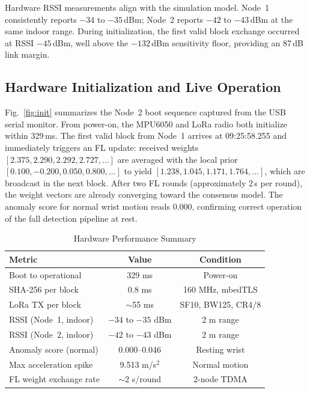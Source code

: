 \documentclass[journal]{IEEEtran}
\begin{document}
Hardware RSSI measurements align with the simulation model. Node~1
consistently reports $-34$ to $-35$\,dBm; Node~2 reports $-42$ to
$-43$\,dBm at the same indoor range. During initialization, the first
valid block exchange occurred at RSSI $-45$\,dBm, well above the
$-132$\,dBm sensitivity floor, providing an 87\,dB link margin.

\subsection{Hardware Initialization and Live Operation}

Fig.~\ref{fig:init} summarizes the Node~2 boot sequence captured from the
USB serial monitor. From power-on, the MPU6050 and LoRa radio both
initialize within 329\,ms. The first valid block from Node~1 arrives at
09:25:58.255 and immediately triggers an FL update: received weights
$[2.375, 2.290, 2.292, 2.727, \ldots]$ are averaged with the local prior
$[0.100, -0.200, 0.050, 0.800, \ldots]$ to yield
$[1.238, 1.045, 1.171, 1.764, \ldots]$, which are broadcast in the
next block. After two FL rounds (approximately 2\,s per round), the weight
vectors are already converging toward the consensus model. The anomaly
score for normal wrist motion reads 0.000, confirming correct operation of
the fall detection pipeline at rest.

\begin{table}[t]
\centering
\caption{Hardware Performance Summary}
\label{tab:hw}
\renewcommand{\arraystretch}{1.2}
\begin{tabular}{lcc}
\toprule
\textbf{Metric} & \textbf{Value} & \textbf{Condition} \\
\midrule
Boot to operational   & 329 ms        & Power-on \\
SHA-256 per block     & 0.8 ms        & 160 MHz, mbedTLS \\
LoRa TX per block     & $\sim$55 ms   & SF10, BW125, CR4/8 \\
RSSI (Node~1, indoor) & $-34$ to $-35$ dBm & 2 m range \\
RSSI (Node~2, indoor) & $-42$ to $-43$ dBm & 2 m range \\
Anomaly score (normal)  & 0.000--0.046  & Resting wrist \\
Max acceleration spike  & 9.513 m/s$^2$ & Normal motion \\
FL weight exchange rate & $\sim$2 s/round & 2-node TDMA \\
\bottomrule
\end{tabular}
\end{table}
\end{document}
